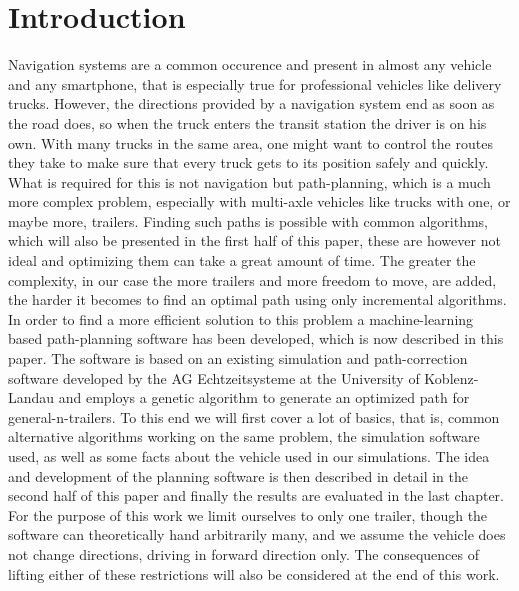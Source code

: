 \chapter{Introduction}
\label{cha:introduction}

Navigation systems are a common occurence and present in almost any vehicle and any smartphone, that is especially true for professional vehicles like delivery trucks. However, the directions provided by a navigation system end as soon as the road does, so when the truck enters the transit station the driver is on his own. With many trucks in the same area, one might want to control the routes they take to make sure that every truck gets to its position safely and quickly. What is required for this is not navigation but path-planning, which is a much more complex problem, especially with multi-axle vehicles like trucks with one, or maybe more, trailers. Finding such paths is possible with common algorithms, which will also be presented in the first half of this paper, these are however not ideal and optimizing them can take a great amount of time. The greater the complexity, in our case the more trailers and more freedom to move, are added, the harder it becomes to find an optimal path using only incremental algorithms. In order to find a more efficient solution to this problem a machine-learning based path-planning software has been developed, which is now described in this paper. The software is based on an existing simulation and path-correction software developed by the AG Echtzeitsysteme at the University of Koblenz-Landau and employs a genetic algorithm to generate an optimized path for general-n-trailers.
To this end we will first cover a lot of basics, that is, common alternative algorithms working on the same problem, the simulation software used, as well as some facts about the vehicle used in our simulations. The idea and development of the planning software is then described in detail in the second half of this paper and finally the results are evaluated in the last chapter. For the purpose of this work we limit ourselves to only one trailer, though the software can theoretically hand arbitrarily many, and we assume the vehicle does not change directions, driving in forward direction only. The consequences of lifting either of these restrictions will also be considered at the end of this work.
